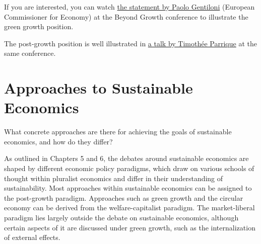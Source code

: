 \documentclass[
  british,
  a4paper,
  DIV=11,
  numbers=noendperiod,
  oneside,
  openany]{scrreprt}
\begin{document}
\begin{tcolorbox}[enhanced jigsaw, arc=.35mm, bottomrule=.15mm, bottomtitle=1mm, breakable, colback=white, colbacktitle=quarto-callout-note-color!10!white, colframe=quarto-callout-note-color-frame, coltitle=black, left=2mm, leftrule=.75mm, opacityback=0, opacitybacktitle=0.6, rightrule=.15mm, title={Further reading}, titlerule=0mm, toprule=.15mm, toptitle=1mm]

If you are interested, you can watch
\href{https://www.youtube.com/watch?v=2rYNewZEazA&t=1129s}{the statement
by Paolo Gentiloni} (European Commissioner for Economy) at the Beyond
Growth conference to illustrate the green growth position.

The post-growth position is well illustrated in
\href{https://www.youtube.com/watch?v=vij3Q6bE6X4}{a talk by Timothée
Parrique} at the same conference.

\end{tcolorbox}

\chapter{Approaches to Sustainable
Economics}\label{approaches-to-sustainable-economics}

\begin{tcolorbox}[enhanced jigsaw, arc=.35mm, bottomrule=.15mm, bottomtitle=1mm, breakable, colback=white, colbacktitle=quarto-callout-note-color!10!white, colframe=quarto-callout-note-color-frame, coltitle=black, left=2mm, leftrule=.75mm, opacityback=0, opacitybacktitle=0.6, rightrule=.15mm, title={Guiding question}, titlerule=0mm, toprule=.15mm, toptitle=1mm]

What concrete approaches are there for achieving the goals of
sustainable economics, and how do they differ?

\end{tcolorbox}

As outlined in Chapters 5 and 6, the debates around sustainable
economics are shaped by different economic policy paradigms, which draw
on various schools of thought within pluralist economics and differ in
their understanding of sustainability. Most approaches within
sustainable economics can be assigned to the post-growth paradigm.
Approaches such as green growth and the circular economy can be derived
from the welfare-capitalist paradigm. The market-liberal paradigm lies
largely outside the debate on sustainable economics, although certain
aspects of it are discussed under green growth, such as the
internalization of external effects.
\end{document}
